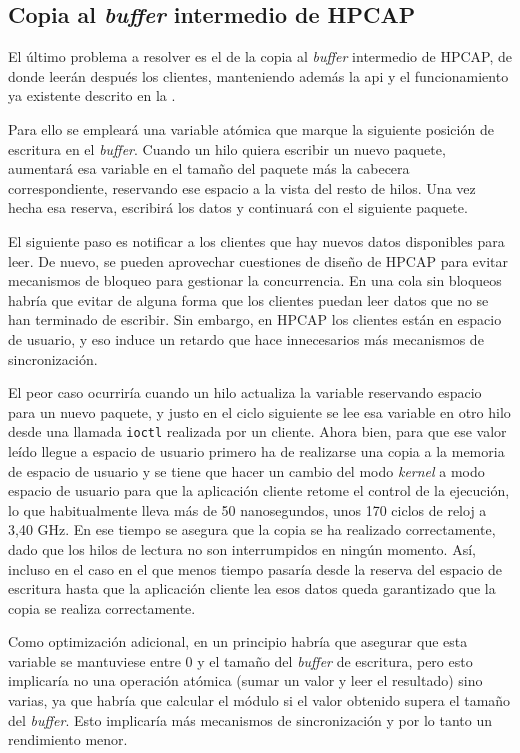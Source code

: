 \documentclass[twoside, 12pt]{epstfg}
\begin{document}
\subsection{Copia al \textit{buffer} intermedio de HPCAP}

El último problema a resolver es el de la copia al \textit{buffer} intermedio de HPCAP, de donde leerán después los clientes, manteniendo además la \gls{api} y el funcionamiento ya existente descrito en la .

Para ello se empleará una variable atómica que marque la siguiente posición de escritura en el \textit{buffer}. Cuando un hilo quiera escribir un nuevo paquete, aumentará esa variable en el tamaño del paquete más la cabecera correspondiente, reservando ese espacio a la vista del resto de hilos. Una vez hecha esa reserva, escribirá los datos y continuará con el siguiente paquete.

El siguiente paso es notificar a los clientes que hay nuevos datos disponibles para leer. De nuevo, se pueden aprovechar cuestiones de diseño de HPCAP para evitar mecanismos de bloqueo para gestionar la concurrencia. En una cola sin bloqueos habría que evitar de alguna forma que los clientes puedan leer datos que no se han terminado de escribir. Sin embargo, en HPCAP los clientes están en espacio de usuario, y eso induce un retardo que hace innecesarios más mecanismos de sincronización.

El peor caso ocurriría cuando un hilo actualiza la variable reservando espacio para un nuevo paquete, y justo en el ciclo siguiente se lee esa variable en otro hilo desde una llamada \texttt{ioctl} realizada por un cliente. Ahora bien, para que ese valor leído llegue a espacio de usuario primero ha de realizarse una copia a la memoria de espacio de usuario y se tiene que hacer un cambio del modo \textit{kernel} a modo espacio de usuario para que la aplicación cliente retome el control de la ejecución, lo que habitualmente lleva más de 50 nanosegundos, unos 170 ciclos de reloj a 3,40 GHz. En ese tiempo se asegura que la copia se ha realizado correctamente, dado que los hilos de lectura no son interrumpidos en ningún momento. Así, incluso en el caso en el que menos tiempo pasaría desde la reserva del espacio de escritura hasta que la aplicación cliente lea esos datos queda garantizado que la copia se realiza correctamente.

Como optimización adicional, en un principio habría que asegurar que esta variable se mantuviese entre 0 y el tamaño del \textit{buffer} de escritura, pero esto implicaría no una operación atómica (sumar un valor y leer el resultado) sino varias, ya que habría que calcular el módulo si el valor obtenido supera el tamaño del \textit{buffer}. Esto implicaría más mecanismos de sincronización y por lo tanto un rendimiento menor.
\end{document}
